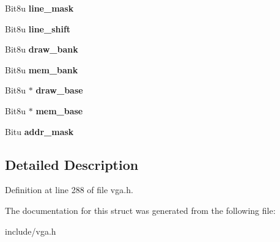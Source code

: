 \begin{DoxyCompactItemize}
\item 
\hypertarget{structVGA__TANDY_ac11ab0eacb74d36a4a3dd6aaf37a686f}{Bit8u {\bfseries line\-\_\-mask}}\label{structVGA__TANDY_ac11ab0eacb74d36a4a3dd6aaf37a686f}

\item 
\hypertarget{structVGA__TANDY_ae12c0fcf6c249e111c6234f01b8cf248}{Bit8u {\bfseries line\-\_\-shift}}\label{structVGA__TANDY_ae12c0fcf6c249e111c6234f01b8cf248}

\item 
\hypertarget{structVGA__TANDY_a5b6d47ade55349d0a33eb63e54395287}{Bit8u {\bfseries draw\-\_\-bank}}\label{structVGA__TANDY_a5b6d47ade55349d0a33eb63e54395287}

\item 
\hypertarget{structVGA__TANDY_a7387ac0d3b061d599ce1afe53910beef}{Bit8u {\bfseries mem\-\_\-bank}}\label{structVGA__TANDY_a7387ac0d3b061d599ce1afe53910beef}

\item 
\hypertarget{structVGA__TANDY_a3e2211caf88d83cc8288bed2fa5fa0af}{Bit8u $\ast$ {\bfseries draw\-\_\-base}}\label{structVGA__TANDY_a3e2211caf88d83cc8288bed2fa5fa0af}

\item 
\hypertarget{structVGA__TANDY_a5e9ff0bd5345f4fb3e7e9e6e5bd2ccad}{Bit8u $\ast$ {\bfseries mem\-\_\-base}}\label{structVGA__TANDY_a5e9ff0bd5345f4fb3e7e9e6e5bd2ccad}

\item 
\hypertarget{structVGA__TANDY_a844355a014b601bccd7728ccc140935e}{Bitu {\bfseries addr\-\_\-mask}}\label{structVGA__TANDY_a844355a014b601bccd7728ccc140935e}

\end{DoxyCompactItemize}


\subsection{Detailed Description}


Definition at line 288 of file vga.\-h.



The documentation for this struct was generated from the following file\-:\begin{DoxyCompactItemize}
\item 
include/vga.\-h\end{DoxyCompactItemize}
